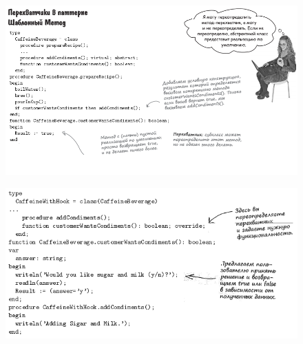 \documentclass{beamer}
\begin{document}
\begin{frame}
\begin{figure}[h]
\centering
\includegraphics[scale=0.5]{images/lec12-pic17.png}
\label{pic-sort}
\end{figure}
\end{frame}

\begin{frame}
\begin{figure}[h]
\centering
\includegraphics[scale=0.6]{images/lec12-pic18.png}
\label{pic-sort}
\end{figure}
\end{frame}
\end{document}
